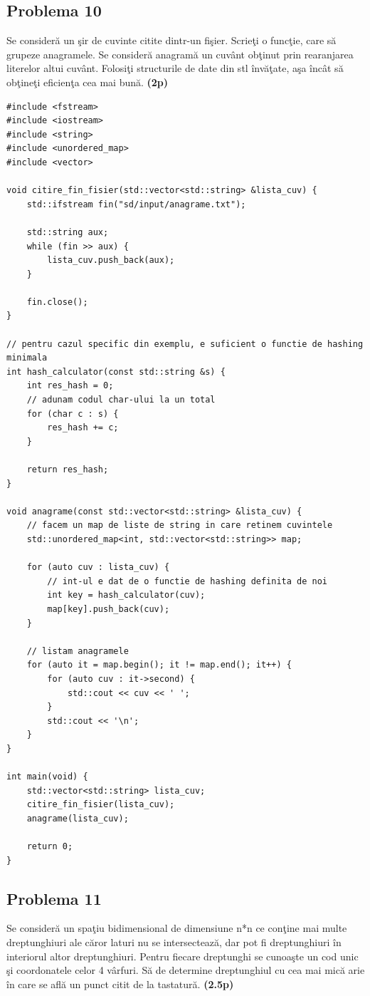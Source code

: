\documentclass[12pt]{article}
\begin{document}
\newpage

\subsection{Problema 10}
Se consideră un şir de cuvinte citite dintr-un fişier. Scrieţi o funcţie, care să grupeze anagramele. Se consideră anagramă un cuvânt obţinut prin rearanjarea literelor altui cuvânt. Folosiţi structurile de date din stl învăţate, aşa încât să obţineţi eficienţa cea mai bună.
\textbf{(2p)}\newline

\begin{lstlisting}
#include <fstream>
#include <iostream>
#include <string>
#include <unordered_map>
#include <vector>

void citire_fin_fisier(std::vector<std::string> &lista_cuv) {
    std::ifstream fin("sd/input/anagrame.txt");

    std::string aux;
    while (fin >> aux) {
        lista_cuv.push_back(aux);
    }

    fin.close();
}

// pentru cazul specific din exemplu, e suficient o functie de hashing minimala
int hash_calculator(const std::string &s) {
    int res_hash = 0;
    // adunam codul char-ului la un total
    for (char c : s) {
        res_hash += c;
    }

    return res_hash;
}

void anagrame(const std::vector<std::string> &lista_cuv) {
    // facem un map de liste de string in care retinem cuvintele
    std::unordered_map<int, std::vector<std::string>> map;

    for (auto cuv : lista_cuv) {
        // int-ul e dat de o functie de hashing definita de noi
        int key = hash_calculator(cuv);
        map[key].push_back(cuv);
    }

    // listam anagramele
    for (auto it = map.begin(); it != map.end(); it++) {
        for (auto cuv : it->second) {
            std::cout << cuv << ' ';
        }
        std::cout << '\n';
    }
}

int main(void) {
    std::vector<std::string> lista_cuv;
    citire_fin_fisier(lista_cuv);
    anagrame(lista_cuv);

    return 0;
}
\end{lstlisting}

\newpage

\subsection{Problema 11}
Se consideră un spaţiu bidimensional de dimensiune n*n ce conţine mai multe dreptunghiuri ale căror laturi nu se intersectează, dar pot fi dreptunghiuri în interiorul altor dreptunghiuri. Pentru fiecare dreptunghi se cunoaşte un cod unic şi coordonatele celor 4 vârfuri. Să de determine dreptunghiul cu cea mai mică arie în care se află un punct citit de la tastatură.
\textbf{(2.5p)}\newline 
\end{document}
